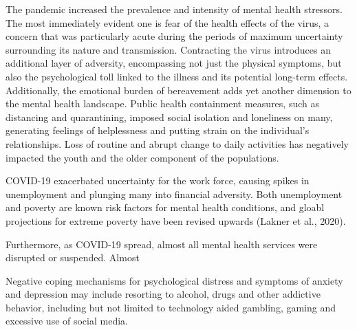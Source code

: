     The pandemic increased the prevalence and intensity of mental health stressors. The most immediately evident one is fear of the health effects of the virus, a concern that was particularly acute during the periods of maximum uncertainty surrounding its nature and transmission. Contracting the virus introduces an additional layer of adversity, encompassing not just the physical symptoms, but also the psychological toll linked to the illness and its potential long-term effects. Additionally, the emotional burden of bereavement adds yet another dimension to the mental health landscape.
    Public health containment measures, such as distancing and quarantining, imposed social isolation and loneliness on many, generating feelings of helplessness and putting strain on the individual's relationships. Loss of routine and abrupt change to daily activities has negatively impacted the youth and the older component of the populations. 

    COVID-19 exacerbated uncertainty for the work force, causing spikes in unemployment and plunging many into financial adversity. Both unemployment and poverty are known risk factors for mental health conditions, and gloabl projections for extreme poverty have been revised upwards (Lakner et al., 2020). 

    Furthermore, as COVID-19 spread, almost all mental health services were disrupted or suspended. Almost 

    Negative coping mechanisms for psychological distress and symptoms of anxiety and depression may include resorting to alcohol, drugs and other addictive behavior, including but not limited to technology aided gambling, gaming and excessive use of social media. 


